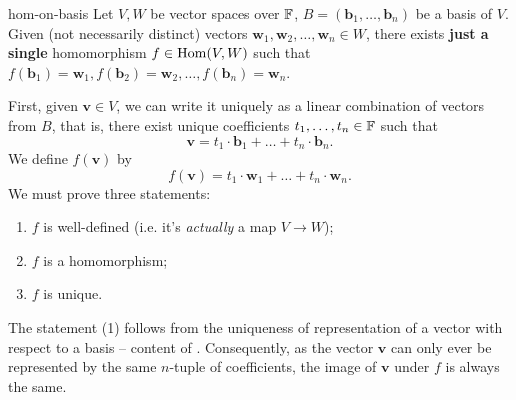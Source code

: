 \begin{theorem}{}{hom-on-basis}
 Let $V,W$ be vector spaces over $\mathbb{F}$, $B = (\mathbf{b}_1,\ldots,\mathbf{b}_n)$
 be a basis of $V$. Given (not necessarily distinct) vectors
 $\mathbf{w}_1,\mathbf{w}_2,\ldots,\mathbf{w}_n \in W$, there exists
 \textbf{just a single} homomorphism $f \in \operatorname{Hom}(V,W)$ such that
 $f(\mathbf{b}_1) = \mathbf{w}_1, f(\mathbf{b}_2) =
 \mathbf{w}_2,\ldots,f(\mathbf{b}_n) = \mathbf{w}_n$.
\end{theorem}
\begin{thmproof}
 First, given $\mathbf{v} \in V$, we can write it uniquely as a linear
 combination of vectors from $B$, that is, there exist unique coefficients
 $t_1,\ldots,t_n \in \mathbb{F}$ such that
 \[
  \mathbf{v} = t_1 \cdot \mathbf{b}_1 + \ldots + t_n \cdot \mathbf{b}_n.
 \]
 We define $f(\mathbf{v})$ by
 \[
  f(\mathbf{v}) = t_1 \cdot \mathbf{w}_1 + \ldots + t_n \cdot \mathbf{w}_n.
 \]
 We must prove three statements:
 \begin{enumerate}
  \item $f$ is well-defined (i.e. it's \emph{actually} a map $V \to W$);
  \item $f$ is a homomorphism;
  \item $f$ is unique.
 \end{enumerate}
 The statement (1) follows from the uniqueness of representation of a vector
 with respect to a basis -- content of
 . Consequently, as the vector
 $\mathbf{v}$ can only ever be represented by the same $n$-tuple of
 coefficients, the image of $\mathbf{v}$ under $f$ is always the same.


\end{thmproof}
